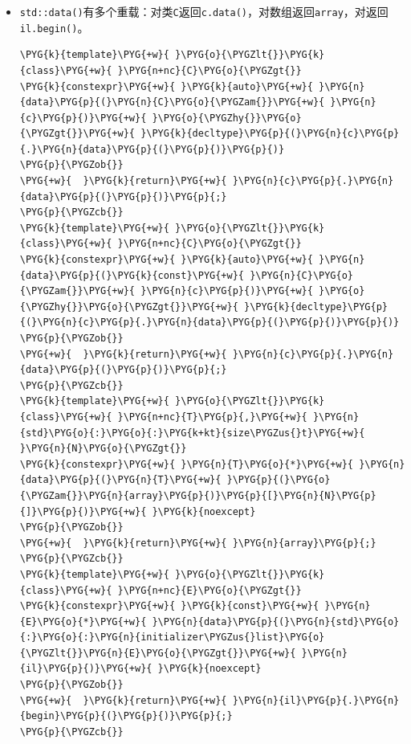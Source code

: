 \begin{itemize}
\item \texttt{std::\allowbreak{}data()}有多个重载：对类\texttt{C}返回\texttt{c.\allowbreak{}data()}，对数组返回\texttt{array}，对返回\texttt{il.\allowbreak{}begin()}。



\begin{codeblockbg}
\begin{Verbatim}[commandchars=\\\{\},breaklines=true,breakanywhere=true,fontsize=\codefont,xleftmargin=17bp]
\PYG{k}{template}\PYG{+w}{ }\PYG{o}{\PYGZlt{}}\PYG{k}{class}\PYG{+w}{ }\PYG{n+nc}{C}\PYG{o}{\PYGZgt{}}
\PYG{k}{constexpr}\PYG{+w}{ }\PYG{k}{auto}\PYG{+w}{ }\PYG{n}{data}\PYG{p}{(}\PYG{n}{C}\PYG{o}{\PYGZam{}}\PYG{+w}{ }\PYG{n}{c}\PYG{p}{)}\PYG{+w}{ }\PYG{o}{\PYGZhy{}}\PYG{o}{\PYGZgt{}}\PYG{+w}{ }\PYG{k}{decltype}\PYG{p}{(}\PYG{n}{c}\PYG{p}{.}\PYG{n}{data}\PYG{p}{(}\PYG{p}{)}\PYG{p}{)}
\PYG{p}{\PYGZob{}}
\PYG{+w}{  }\PYG{k}{return}\PYG{+w}{ }\PYG{n}{c}\PYG{p}{.}\PYG{n}{data}\PYG{p}{(}\PYG{p}{)}\PYG{p}{;}
\PYG{p}{\PYGZcb{}}
\PYG{k}{template}\PYG{+w}{ }\PYG{o}{\PYGZlt{}}\PYG{k}{class}\PYG{+w}{ }\PYG{n+nc}{C}\PYG{o}{\PYGZgt{}}
\PYG{k}{constexpr}\PYG{+w}{ }\PYG{k}{auto}\PYG{+w}{ }\PYG{n}{data}\PYG{p}{(}\PYG{k}{const}\PYG{+w}{ }\PYG{n}{C}\PYG{o}{\PYGZam{}}\PYG{+w}{ }\PYG{n}{c}\PYG{p}{)}\PYG{+w}{ }\PYG{o}{\PYGZhy{}}\PYG{o}{\PYGZgt{}}\PYG{+w}{ }\PYG{k}{decltype}\PYG{p}{(}\PYG{n}{c}\PYG{p}{.}\PYG{n}{data}\PYG{p}{(}\PYG{p}{)}\PYG{p}{)}
\PYG{p}{\PYGZob{}}
\PYG{+w}{  }\PYG{k}{return}\PYG{+w}{ }\PYG{n}{c}\PYG{p}{.}\PYG{n}{data}\PYG{p}{(}\PYG{p}{)}\PYG{p}{;}
\PYG{p}{\PYGZcb{}}
\PYG{k}{template}\PYG{+w}{ }\PYG{o}{\PYGZlt{}}\PYG{k}{class}\PYG{+w}{ }\PYG{n+nc}{T}\PYG{p}{,}\PYG{+w}{ }\PYG{n}{std}\PYG{o}{:}\PYG{o}{:}\PYG{k+kt}{size\PYGZus{}t}\PYG{+w}{ }\PYG{n}{N}\PYG{o}{\PYGZgt{}}
\PYG{k}{constexpr}\PYG{+w}{ }\PYG{n}{T}\PYG{o}{*}\PYG{+w}{ }\PYG{n}{data}\PYG{p}{(}\PYG{n}{T}\PYG{+w}{ }\PYG{p}{(}\PYG{o}{\PYGZam{}}\PYG{n}{array}\PYG{p}{)}\PYG{p}{[}\PYG{n}{N}\PYG{p}{]}\PYG{p}{)}\PYG{+w}{ }\PYG{k}{noexcept}
\PYG{p}{\PYGZob{}}
\PYG{+w}{  }\PYG{k}{return}\PYG{+w}{ }\PYG{n}{array}\PYG{p}{;}
\PYG{p}{\PYGZcb{}}
\PYG{k}{template}\PYG{+w}{ }\PYG{o}{\PYGZlt{}}\PYG{k}{class}\PYG{+w}{ }\PYG{n+nc}{E}\PYG{o}{\PYGZgt{}}
\PYG{k}{constexpr}\PYG{+w}{ }\PYG{k}{const}\PYG{+w}{ }\PYG{n}{E}\PYG{o}{*}\PYG{+w}{ }\PYG{n}{data}\PYG{p}{(}\PYG{n}{std}\PYG{o}{:}\PYG{o}{:}\PYG{n}{initializer\PYGZus{}list}\PYG{o}{\PYGZlt{}}\PYG{n}{E}\PYG{o}{\PYGZgt{}}\PYG{+w}{ }\PYG{n}{il}\PYG{p}{)}\PYG{+w}{ }\PYG{k}{noexcept}
\PYG{p}{\PYGZob{}}
\PYG{+w}{  }\PYG{k}{return}\PYG{+w}{ }\PYG{n}{il}\PYG{p}{.}\PYG{n}{begin}\PYG{p}{(}\PYG{p}{)}\PYG{p}{;}
\PYG{p}{\PYGZcb{}}
\end{Verbatim}
\end{codeblockbg}



\end{itemize}
